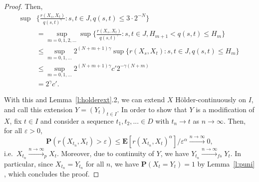 \documentclass{article}
\theoremstyle{definition}
\theoremstyle{step} \newtheorem{step}{Step}
\begin{document}
\begin{proof}
  Then,
  \begin{align*}
    \sup & \Big\{\frac{r(X_s, X_t)}{q(s,t)^\gamma}: {s,t\in J, q(s,t) \leq 3\cdot 2^{-N}} \Big\} \\ & = \sup_{m=0,1,2,...} \sup \Big\{\frac{r(X_s, X_t)}{q(s,t)^\gamma}: s,t\in J, H_{m+1}  < q(s,t) \leq H_m\Big\} \\ & \leq \sup_{m=0, 1,...} 2^{(N+m+1)\gamma}\sup \big\{r(X_s, X_t): s,t\in J, q(s,t) \leq H_m\big\} \\ & \leq \sup_{m=0,1,...} 2^{(N+m+1)\gamma} c' 2^{-\gamma (N+m)} \\ & = 2^{\gamma}c'.
  \end{align*}


  With this and Lemma~\ref{l:holderext}.2, we can extend $X$
  Hölder-continuously on $I$, and call this extension $ Y =
    (Y_t)_{t\in I}$. In order to show that $Y$ is a modification of $X$,
  fix $t\in I$ and consider a sequence $t_1,t_2,...\in D$ with $t_n\to
    t$ as $n\to \infty$. Then, for all $\varepsilon>0$,
  $$\mathbf P(r(X_{t_n}, X_t) > \varepsilon) \leq \mathbf E[r(X_{t_n},
        X_t)^\alpha]/\varepsilon^\alpha \xrightarrow{n\to\infty} 0,$$
  i.e.\ $X_{t_n} \xrightarrow{n\to\infty}_p X_t$. Moreover, due to
  continuity of $Y$, we have $Y_{t_n} \xrightarrow{n\to\infty}_{fs}
    Y_t$. In particular, since $X_{t_n} = Y_{t_n}$ for all $n$, we have
  $\mathbf P(X_t= Y_t)=1$ by Lemma~\ref{l:puni} , which concludes the
  proof.
\end{proof}





\end{document}
